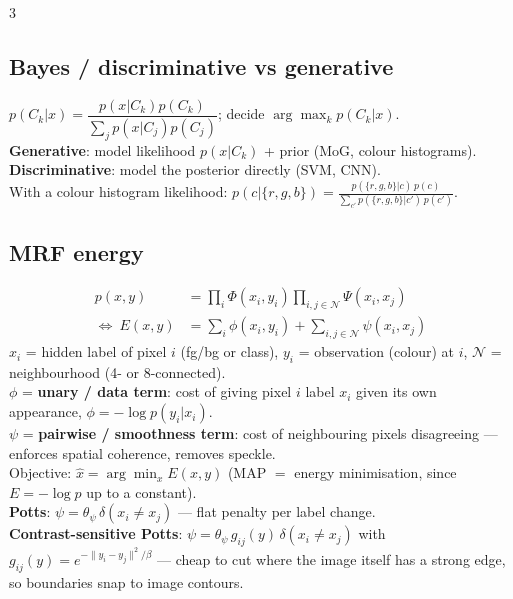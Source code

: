 \documentclass[9pt,a4paper,landscape]{extarticle}
\newcommand{\key}[1]{\textbf{#1}}
\begin{document}
\begin{multicols}{3}
\subsection{Bayes / discriminative vs generative}
$p(C_k|x)=\dfrac{p(x|C_k)p(C_k)}{\sum_j p(x|C_j)p(C_j)}$; decide $\arg\max_k p(C_k|x)$.\\
\key{Generative}: model likelihood $p(x|C_k)$ + prior (MoG, colour histograms). \key{Discriminative}: model the posterior directly (SVM, CNN).\\
With a colour histogram likelihood: $p(c|\{r,g,b\})=\frac{p(\{r,g,b\}|c)\,p(c)}{\sum_{c'}p(\{r,g,b\}|c')\,p(c')}$.

\subsection{MRF energy}
\vspace{-6pt}
\begin{align*}
p(x,y)&=\textstyle\prod_i\Phi(x_i,y_i)\prod_{i,j\in\mathcal N}\Psi(x_i,x_j)\\[-1pt]
\Longleftrightarrow\ E(x,y)&=\textstyle\sum_i\phi(x_i,y_i)+\sum_{i,j\in\mathcal N}\psi(x_i,x_j)
\end{align*}
\vspace{-10pt}
$x_i$ = hidden label of pixel $i$ (fg/bg or class), $y_i$ = observation (colour) at $i$, $\mathcal N$ = neighbourhood (4- or 8-connected).\\
$\phi$ = \key{unary / data term}: cost of giving pixel $i$ label $x_i$ given its own appearance, $\phi=-\log p(y_i|x_i)$.\\
$\psi$ = \key{pairwise / smoothness term}: cost of neighbouring pixels disagreeing --- enforces spatial coherence, removes speckle.\\
Objective: $\hat x=\arg\min_x E(x,y)$ (MAP $=$ energy minimisation, since $E=-\log p$ up to a constant).\\
\key{Potts}: $\psi=\theta_\psi\,\delta(x_i\neq x_j)$ --- flat penalty per label change.\\
\key{Contrast-sensitive Potts}: $\psi=\theta_\psi\,g_{ij}(y)\,\delta(x_i\neq x_j)$ with $g_{ij}(y)=e^{-\|y_i-y_j\|^2/\beta}$ --- cheap to cut where the image itself has a strong edge, so boundaries snap to image contours.


\end{multicols}
\end{document}
